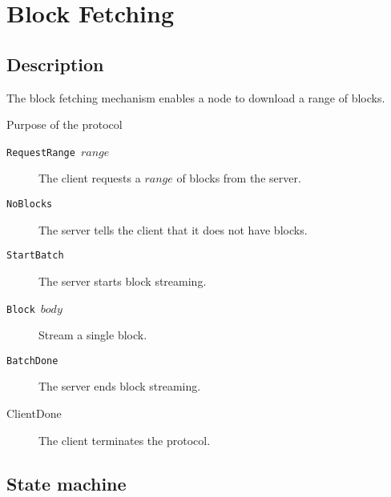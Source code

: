 \documentclass{report}
\newcommand{\hsref}[1]{} %
\newcommand{\state}[1]{\texttt{#1}}
\newcommand{\Idle}{\state{Idle}}
\newcommand{\Busy}{\state{Busy}}
\newcommand{\Done}{\state{Done}}
\theoremstyle{definition}{
  \newtheorem{lemma}{Lemma}[section] %
  \newtheorem{definition}[lemma]{Definition}
}
\theoremstyle{theorem}{
  \newtheorem{invariant}[lemma]{Invariant}
  \newtheorem{proofobligation}[lemma]{Proof Obligation}
}
\numberwithin{equation}{lemma}
\begin{document}
\section{Block Fetching}
\label{block-fetching-protocol}
\hsref{ouroboros-network/ouroboros-network/src/Ouroboros/Network/Protocol/BlockFetch2/Type.hs}
\hsref{branch coot/block-fetch-v2}
\subsection{Description}
\renewcommand{\Idle}{\state{Idle}}
\renewcommand{\Busy}{\state{Busy}}
\newcommand{\Streaming}{\state{Streaming}}
\renewcommand{\Done}{\state{Done}}
\newcommand{\RequestRange}{\state{RequestRange}}
\newcommand{\StartBatch}{\state{StartBatch}}
\newcommand{\NoBlocks}{\state{NoBlocks}}
\newcommand{\Block}{\state{Block}}
\newcommand{\BatchDone}{\state{BatchDone}}
\newcommand{\ClientDone}{\state{ClientDone}}

The block fetching mechanism enables a node to download a range of blocks.

\begin{description}
\item[Purpose of the protocol]

\end{description}

\begin{description}
\item [\RequestRange~{\boldmath $range$}]
  The client requests a {\boldmath $range$} of blocks from the server.
\item [\NoBlocks]
  The server tells the client that it does not have blocks.
\item [\StartBatch]
  The server starts block streaming.
\item [\Block~{\boldmath $body$}]
  Stream a single block.
\item [\BatchDone]
  The server ends block streaming.
\item [ClientDone]
  The client terminates the protocol.
\end{description}

\subsection{State machine}
\end{document}
